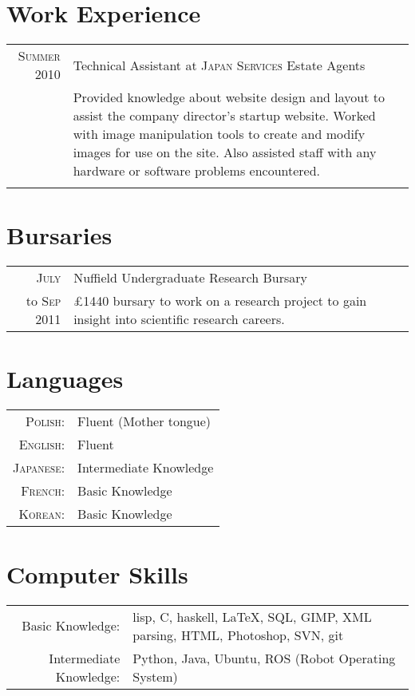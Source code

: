 \documentclass[a4paper,10pt]{article}
\begin{document}
\section{Work Experience}
\begin{tabular}{r|p{11cm}}
  \textsc{Summer 2010}& Technical Assistant at \textsc{Japan Services} Estate Agents\\
  &\footnotesize{Provided knowledge about website design and layout to assist the company director's startup website. Worked with image manipulation tools to create and modify images for use on the site. Also assisted staff with any hardware or software problems encountered.}\\\multicolumn{2}{c}{} \\
\end{tabular}

\section{Bursaries}
\begin{tabular}{r|p{11cm}}
  \textsc{July} & Nuffield Undergraduate Research Bursary\\
  to \textsc{Sep 2011}&\footnotesize{£1440 bursary to work on a research project to gain insight into scientific research careers.}
\end{tabular}

\section{Languages}
\begin{tabular}{rl}
  \textsc{Polish:}& Fluent (Mother tongue)\\
  \textsc{English:}&Fluent\\
  \textsc{Japanese:}&Intermediate Knowledge\\
  \textsc{French:}&Basic Knowledge\\
  \textsc{Korean:}&Basic Knowledge\\
\end{tabular}

\section{Computer Skills}
\begin{tabular}{rp{9cm}}
  Basic Knowledge:& lisp, C, haskell, \LaTeX, SQL, GIMP, XML parsing, HTML, Photoshop, SVN, git\\
  Intermediate Knowledge:& Python, Java, Ubuntu, ROS (Robot Operating System)
\end{tabular}
\end{document}
